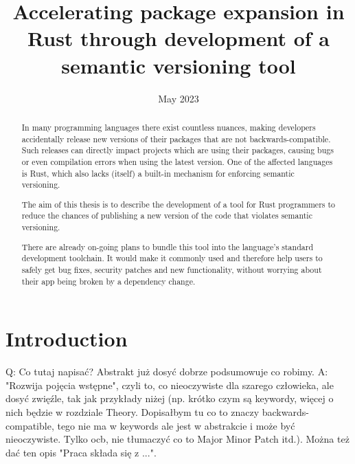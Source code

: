 \documentclass[licencjacka,en]{pracamgr}
\title{Accelerating package expansion in Rust through development of a semantic versioning tool}
\date{May 2023}
\begin{document}
\maketitle

\begin{abstract}
In many programming languages there exist countless nuances,
making developers accidentally release new versions of their packages
that are not backwards-compatible.
Such releases can directly impact projects which are using their packages,
causing bugs or even compilation errors when using the latest version.
One of the affected languages is Rust,
which also lacks (itself) a built-in mechanism for enforcing semantic versioning.

The aim of this thesis is to describe the development of a tool
for Rust programmers to reduce the chances of publishing
a new version of the code that violates semantic versioning.

There are already on-going plans to bundle this tool
into the language's standard development toolchain.
It would make it commonly used and therefore help users to safely get bug fixes,
security patches and new functionality,
without worrying about their app being broken by a dependency change.
\end{abstract}

\tableofcontents



\chapter*{Introduction}

Q: Co tutaj napisać? Abstrakt już dosyć dobrze podsumowuje co robimy.
A: "Rozwija pojęcia wstępne", czyli to, co nieoczywiste dla szarego człowieka,
   ale dosyć zwięźle, tak jak przykłady niżej (np. krótko czym są keywordy, więcej
   o nich będzie w rozdziale Theory. Dopisałbym tu co to znaczy backwards-compatible,
   tego nie ma w keywords ale jest w abstrakcie i może być nieoczywiste. Tylko ocb,
   nie tłumaczyć co to Major Minor Patch itd.). Można też dać ten opis "Praca składa
   się z ...".

\end{document}
